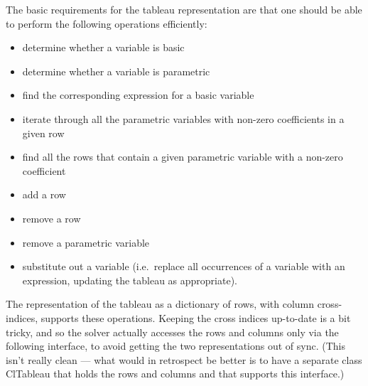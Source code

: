 \documentclass{article}
\begin{document}
The basic requirements for the tableau representation are that one should
be able to perform the following operations efficiently:

\begin{itemize}

\item determine whether a variable is basic

\item determine whether a variable is parametric

\item find the corresponding expression for a basic variable

\item iterate through all the parametric variables with non-zero
coefficients in a given row

\item find all the rows that contain a given parametric variable with a
non-zero coefficient

\item add a row

\item remove a row

\item remove a parametric variable

\item substitute out a variable (i.e.\ replace all occurrences of a
variable with an expression, updating the tableau as appropriate).

\end{itemize}

The representation of the tableau as a dictionary of rows, with column
cross-indices, supports these operations.  Keeping the cross indices
up-to-date is a bit tricky, and so the solver actually accesses the rows
and columns only via the following interface, to avoid getting the two
representations out of sync.  (This isn't really clean --- what would in
retrospect be better is to have a separate class {\sf ClTableau} that holds
the rows and columns and that supports this interface.)
\end{document}
